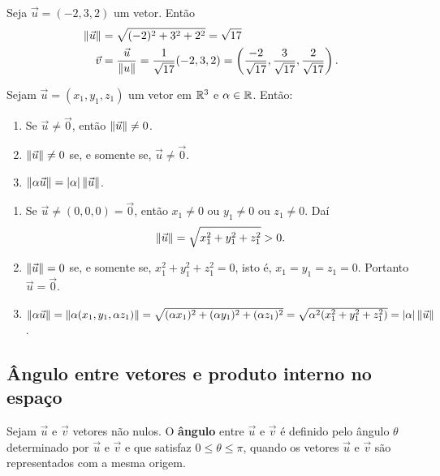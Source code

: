 \begin{exemplo}
    Seja $\vec{u} = (-2,3,2)$ um vetor. Então
    \begin{align*}
        \left\Vert{\vec{u}}\right\Vert & = \sqrt{(-2)^2 + 3^2 + 2^2} = \sqrt{17}                                                                                                      \\
        \vec{v}        & = \dfrac{\vec{u}}{\left\Vert{u}\right\Vert} = \dfrac{1}{\sqrt{17}}(-2,3,2) = \left(\dfrac{-2}{\sqrt{17}}, \dfrac{3}{\sqrt{17}}, \dfrac{2}{\sqrt{17}}\right).
    \end{align*}
\end{exemplo}

\begin{proposicao}
    Sejam $\vec{u} = (x_1, y_1,z_1)$ um vetor em $\mathbb{R}^3$ e $\alpha \in \mathbb{R}$. Então:
    \begin{enumerate}
        \item Se $\vec{u} \ne \vec{0}$, então $\left\Vert{\vec{u}}\right\Vert \ne 0$.
        \item $\left\Vert{\vec{u}}\right\Vert \ne 0$ se, e somente se, $\vec{u} \ne \vec{0}$.
        \item $\left\Vert{\alpha\vec{u}}\right\Vert = |\alpha|\left\Vert{\vec{u}}\right\Vert$.
    \end{enumerate}
\end{proposicao}
\begin{prova}
    \begin{enumerate}
        \item  Se $\vec{u} \ne (0,0,0) = \vec{0}$, então $x_1 \ne 0$ ou $y_1 \ne 0$ ou $z_1 \ne 0$. Daí
              \[
                  \left\Vert{\vec{u}}\right\Vert = \sqrt{x_1^2 + y_1^2 + z_1^2} > 0.
              \]
        \item $\left\Vert{\vec{u}}\right\Vert = 0$ se, e somente se, $x_1^2 + y_1^2 + z_1^2 = 0$, isto é, $x_1 = y_1 = z_1 = 0$. Portanto $\vec{u} = \vec{0}$.
        \item $\left\Vert{\alpha\vec{u}}\right\Vert = \left\Vert{\alpha(x_1, y_1, \alpha z_1)}\right\Vert = \sqrt{(\alpha x_1)^2 + (\alpha y_1)^2 + (\alpha z_1)^2} = \sqrt{\alpha^2(x_1^2 + y_1^2 + z_1^2)} = |\alpha|\left\Vert{\vec{u}}\right\Vert$.
    \end{enumerate}
\end{prova}

\subsection{Ângulo entre vetores e produto interno no espaço}

\begin{definicao}
    Sejam $\vec{u}$ e $\vec{v}$ vetores não nulos. O \textbf{ângulo} entre $\vec{u}$ e $\vec{v}$ é definido pelo ângulo $\theta$ determinado por $\vec{u}$ e $\vec{v}$ e que satisfaz $0 \le \theta \le \pi$, quando os vetores $\vec{u}$ e $\vec{v}$ são representados com a mesma origem.
\end{definicao}

